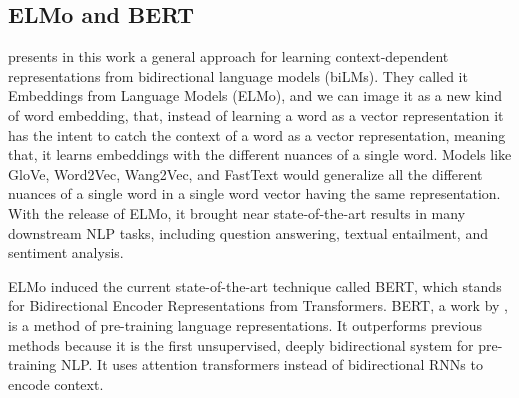 \subsection{ELMo and BERT}

 presents in this work a general approach for learning context-dependent representations from bidirectional language models (biLMs). They called it Embeddings from Language Models (ELMo), and we can image it as a new kind of word embedding, that, instead of learning a word as a vector representation it has the intent to catch the context of a word as a vector representation, meaning that, it learns embeddings with the different nuances of a single word. Models like GloVe, Word2Vec, Wang2Vec, and FastText would generalize all the different nuances of a single word in a single word vector having the same representation. With the release of ELMo, it brought near state-of-the-art results in many downstream NLP tasks,  including question answering, textual entailment, and sentiment analysis.

ELMo induced the current state-of-the-art technique called BERT, which stands for Bidirectional Encoder Representations from Transformers.  
BERT, a work by , is a method of pre-training language representations. It outperforms previous methods because it is the first unsupervised, deeply bidirectional system for pre-training NLP. It uses attention transformers instead of bidirectional RNNs to encode context.


